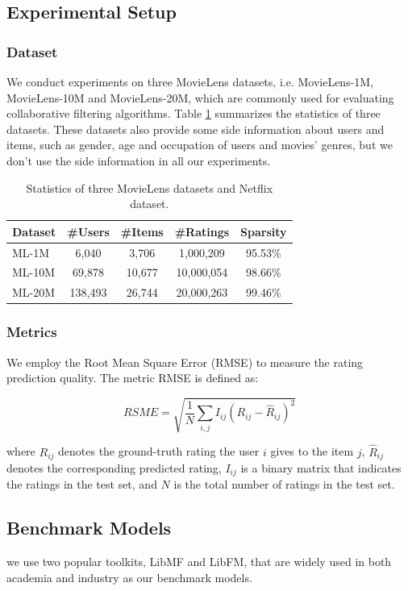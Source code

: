 \documentclass{llncs}
\begin{document}
\subsection{Experimental Setup}
\subsubsection{Dataset}
We conduct experiments on three MovieLens datasets, i.e. MovieLens-1M,
MovieLens-10M and MovieLens-20M, which are commonly used for evaluating
collaborative filtering algorithms.
Table \ref{tab:statistics} summarizes the statistics of three datasets.
These datasets also provide some side information about users and items,
such as gender, age and occupation of users and movies' genres,
but we don't use the side information in all our experiments.

\begin{table}[htbp]
	\centering
	\caption{Statistics of three MovieLens datasets and Netflix dataset.}
	\label{tab:statistics}
	\begin{tabular}{|l|c|c|c|c|}
		\hline
		\textbf{Dataset} & \textbf{\#Users} & \textbf{\#Items} & \textbf{\#Ratings} & \textbf{Sparsity} \\
		\hline
		ML-1M  & 6,040    & 3,706  & 1,000,209   & 95.53\% \\
		ML-10M & 69,878   & 10,677 & 10,000,054  & 98.66\% \\
		ML-20M & 138,493  & 26,744 & 20,000,263  & 99.46\% \\
		\hline
	\end{tabular}
\end{table}

\subsubsection{Metrics}
We employ the Root Mean Square Error (RMSE) to measure the rating prediction quality.
The metric RMSE is defined as:

\begin{equation}
RSME = \sqrt{ \frac{1}{N} \sum_{i,j} I_{ij} (R_{ij} - \hat{R}_{ij})^2 }
\end{equation}

where $R_{ij}$ denotes the ground-truth rating the user $i$ gives to the item $j$,
$\hat{R}_{ij}$ denotes the corresponding predicted rating,
$I_{ij}$ is a binary matrix that indicates the ratings in the test set,
and $N$ is the total number of ratings in the test set.

\subsection{Benchmark Models}
we use two popular toolkits, LibMF and LibFM, that are
widely used in both academia and industry as our benchmark models.
\end{document}
